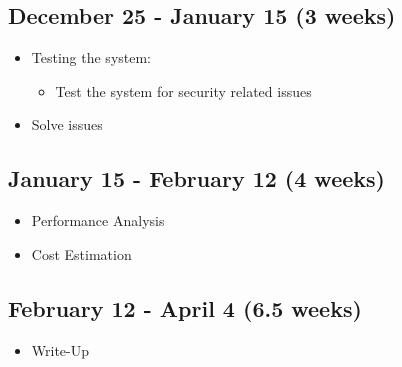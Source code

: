 \documentclass[a4paper, 11pt]{article}
\begin{document}
\subsection*{December 25 - January 15 (3 weeks)}
\begin{itemize}
    \item Testing the system: \begin{itemize}
                                \item Test the system for security related issues
                               \end{itemize}
    \item Solve issues
\end{itemize}

\subsection*{January 15 - February 12 (4 weeks)}
\begin{itemize}
    \item Performance Analysis
    \item Cost Estimation
\end{itemize}

\subsection*{February 12 - April 4 (6.5 weeks)}
\begin{itemize}
    \item Write-Up
\end{itemize}




%
%
\end{document}

